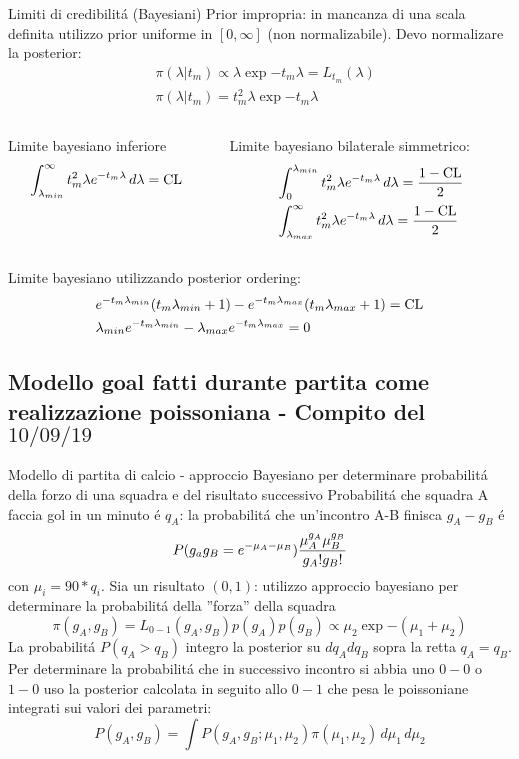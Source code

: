 \begin{frame}{Limiti di credibilit\'a (Bayesiani)}
Prior impropria: in mancanza di una scala definita utilizzo prior uniforme in $[0,\infty]$ (non normalizabile). Devo normalizare la posterior:
\begin{align*}
&\pi(\lambda|t_m)\propto \lambda\exp{-t_m\lambda}=L_{t_m}(\lambda)\\
&\pi(\lambda|t_m)=t_m^2\lambda\exp{-t_m\lambda}
\end{align*}
\begin{columns}[T]
	\begin{column}{0.5\textwidth}
Limite bayesiano inferiore
\begin{equation*}
\int_{\lambda_{min}}^{\infty}t_m^2\lambda e^{-t_m\lambda}\,d\lambda=\operatorname{CL}{}
\end{equation*}
	\end{column}
	\begin{column}{0.5\textwidth}
Limite bayesiano bilaterale simmetrico:
\begin{align*}
&\int_0^{\lambda_{min}}t_m^2\lambda e^{-t_m\lambda}\,d\lambda=\frac{1-\operatorname{CL}}{2}\\
&\int_{\lambda_{max}}^{\infty}t_m^2\lambda e^{-t_m\lambda}\,d\lambda=\frac{1-\operatorname{CL}}{2}
\end{align*}
\end{column}
\end{columns}
Limite bayesiano utilizzando posterior ordering:
\begin{align*}
&e^{-t_m\lambda_{min}}(t_m\lambda_{min}+1)-e^{-t_m\lambda_{max}}(t_m\lambda_{max}+1)=\operatorname{CL}\\
&\lambda_{min}e^{-t_m\lambda_{min}}-\lambda_{max}e^{-t_m\lambda_{max}}=0
\end{align*}
\end{frame}

\subsection{Modello goal fatti durante partita come realizzazione poissoniana - Compito del $10/09/19$}

\begin{frame}{Modello di partita di calcio - approccio Bayesiano per determinare probabilit\'a della forzo di una squadra e del risultato successivo}
Probabilit\'a che squadra A faccia gol in un minuto \'e $q_A$: la probabilit\'a che un'incontro A-B finisca $g_A-g_B$ \'e
\[P(g_ag_B=e^{-\mu_A-\mu_B})\frac{\mu_A^{g_A}\mu_B^{g_B}}{g_A!g_B!}\] con $\mu_i=90*q_i$.
Sia un risultato $(0,1)$: utilizzo approccio bayesiano per determinare la probabilit\'a della ''forza'' della squadra
\[\pi(g_A,g_B)=L_{0-1}(g_A,g_B)p(g_A)p(g_B)\propto\mu_2\exp{-(\mu_1+\mu_2)}\]
La probabilit\'a $P(q_A>q_B)$ integro la posterior su $dq_Adq_B$ sopra la retta $q_A=q_B$. Per determinare la probabilit\'a che in successivo incontro si abbia uno $0-0$ o $1-0$ uso la posterior calcolata in seguito allo $0-1$ che pesa le poissoniane integrati sui valori dei parametri:
\[P(g_A,g_B)=\int P(g_A,g_B;\mu_1,\mu_2)\pi(\mu_1,\mu_2)\,d\mu_1\,d\mu_2\]
\end{frame}

